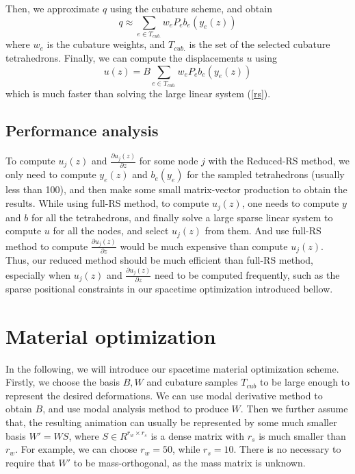 \documentclass[9pt,twocolumn]{extarticle}
\begin{document}
Then, we approximate $q$ using the cubature scheme, and obtain
\begin{equation} \label{reduced_rs3} 
  q \approx \sum_{e\in{T_{cub.}}}w_eP_e{b_e(y_e(z))}
\end{equation} 
where $w_e$ is the cubature weights, and $T_{cub.}$ is the set of the selected
cubature tetrahedrons. Finally, we can compute the displacements $u$ using
\begin{equation} \label{reduced_rs4}
  u(z) = B \sum_{e\in{T_{cub.}}}w_eP_e{b_e(y_e(z))}
\end{equation} 
which is much faster than solving the large linear system (\ref{rs}).

\subsection{Performance analysis} 
To compute $u_j(z)$ and $\frac{\partial{u_j(z)}}{\partial{z}}$ for some node $j$
with the Reduced-RS method, we only need to compute $y_e(z)$ and $b_e(y_e)$ for
the sampled tetrahedrons (usually less than 100), and then make some small
matrix-vector production to obtain the results. While using full-RS method, to
compute $u_j(z)$, one needs to compute $y$ and $b$ for all the tetrahedrons, and
finally solve a large sparse linear system to compute $u$ for all the nodes, and
select $u_j(z)$ from them. And use full-RS method to compute
$\frac{\partial{u_j(z)}}{\partial{z}}$ would be much expensive than compute
$u_j(z)$. Thus, our reduced method should be much efficient than full-RS method,
especially when $u_j(z)$ and $\frac{\partial{u_j(z)}}{\partial{z}}$ need to be
computed frequently, such as the sparse positional constraints in our spacetime
optimization introduced bellow.

\section{Material optimization}\label{sec:mater-optim}
In the following, we will introduce our spacetime material optimization scheme.
Firstly, we choose the basis $B,W$ and cubature samples $T_{cub}$ to be large
enough to represent the desired deformations. We can use modal derivative method
to obtain $B$, and use modal analysis method to produce $W$. Then we further
assume that, the resulting animation can usually be represented by some much
smaller basis $W'=WS$, where $S\in R^{r_w\times r_s}$ is a dense matrix with
$r_s$ is much smaller than $r_w$. For example, we can choose $r_w=50$, while
$r_s=10$. There is no necessary to require that $W'$ to be mass-orthogonal, as
the mass matrix is unknown.
\end{document}
